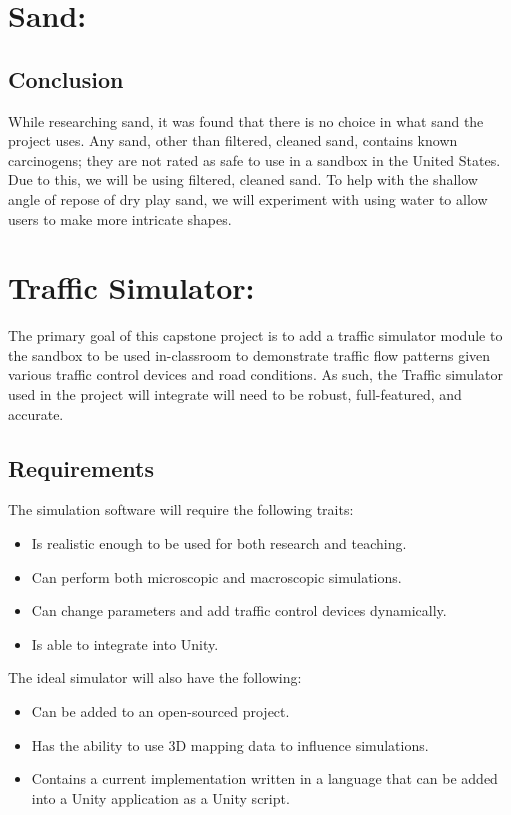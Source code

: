 \documentclass[IEEEtran]{article}
\begin{document}
\clearpage
\newpage


\section{Sand: }
\label{sec:sand}
\subsection{Conclusion}
While researching sand, it was found that there is no choice in what sand the project uses. Any sand, other than filtered, cleaned sand, contains known carcinogens; they are not rated as safe to use in a sandbox in the United States. Due to this, we will be using filtered, cleaned sand. To help with the shallow angle of repose of dry play sand, we will experiment with using water to allow users to make more intricate shapes. 

\section{Traffic Simulator: }
\label{sec:traffic-simulator}
The primary goal of this capstone project is to add a traffic simulator module to the sandbox to be used in-classroom to demonstrate traffic flow patterns given various traffic control devices and road conditions. As such, the Traffic simulator used in the project will integrate will need to be robust, full-featured, and accurate. 

\subsection{Requirements}
 The simulation software will require the following traits:
\begin{itemize}
    \item Is realistic enough to be used for both research and teaching. 
    \item Can perform both microscopic and macroscopic simulations.
    \item Can change parameters and add traffic control devices dynamically.
    \item Is able to integrate into Unity.
\end{itemize}
The ideal simulator will also have the following: 
\begin{itemize}
    \item Can be added to an open-sourced project.
    \item Has the ability to use 3D mapping data to influence simulations.
    \item Contains a current implementation written in a language that can be added into a Unity application as a Unity script.
\end{itemize}
\end{document}
